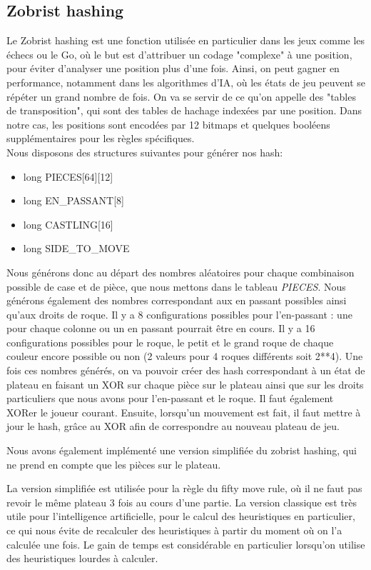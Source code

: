 \documentclass{article}
\begin{document}
\subsection{Zobrist hashing} \label{Zobrist}
Le Zobrist hashing est une fonction utilisée en particulier dans les jeux comme les échecs ou le Go, où le but est d'attribuer un codage "complexe" à
une position, pour éviter d'analyser une position plus d'une fois. Ainsi, on peut gagner en performance, notamment dans les algorithmes d'IA, où les
états de jeu peuvent se répéter un grand nombre de fois. On va se servir de ce qu'on appelle des "tables de transposition", qui sont des tables de
hachage indexées par une position. Dans notre cas, les positions sont encodées par 12 bitmaps et quelques booléens
supplémentaires pour les règles spécifiques.
\\Nous disposons des structures suivantes pour générer nos hash:\\
\begin{itemize}
    \item long PIECES[64][12]
    \item long EN\_PASSANT[8]
    \item long CASTLING[16]
    \item long SIDE\_TO\_MOVE
\end{itemize}

Nous générons donc au départ des nombres aléatoires pour chaque combinaison possible de case et de pièce, que nous mettons dans le tableau \textit{PIECES}.
Nous générons également des nombres correspondant aux en passant possibles ainsi qu'aux droits de roque. Il y a 8 configurations possibles pour l'en-passant :
une pour chaque colonne ou un en passant pourrait être en cours.
Il y a 16 configurations possibles pour le roque, le petit et le grand roque de chaque couleur encore possible ou non (2 valeurs pour 4 roques différents soit 2**4).
Une fois ces nombres générés, on va pouvoir créer des hash correspondant à un état de plateau en faisant un XOR sur chaque pièce sur le plateau ainsi que sur
les droits particuliers que nous avons pour l'en-passant et le roque. Il faut également XORer le joueur courant.
Ensuite, lorsqu'un mouvement est fait, il faut mettre à jour le hash, grâce au XOR afin de correspondre au nouveau plateau de jeu.

Nous avons également implémenté une version simplifiée du zobrist hashing, qui ne prend en compte que les pièces sur le plateau.

La version simplifiée est utilisée pour la règle du fifty move rule, où il ne faut pas revoir le même plateau 3 fois au cours d'une partie.
La version classique est très utile pour l'intelligence artificielle, pour le calcul des heuristiques en particulier, ce qui nous évite de recalculer des heuristiques 
à partir du moment où on l'a calculée une fois. Le gain de temps est considérable en particulier lorsqu'on utilise des heuristiques lourdes à calculer.
\end{document}
